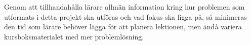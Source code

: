 \textcolor{Mahogany}{
    Genom att tillhandahålla lärare allmän information kring hur problemen som utformats i detta projekt ska utföras och vad fokus ska ligga på, så minimeras den tid som lärare behöver lägga för att planera lektionen, men ändå variera kursboksmaterialet med mer problemlösning.
}

